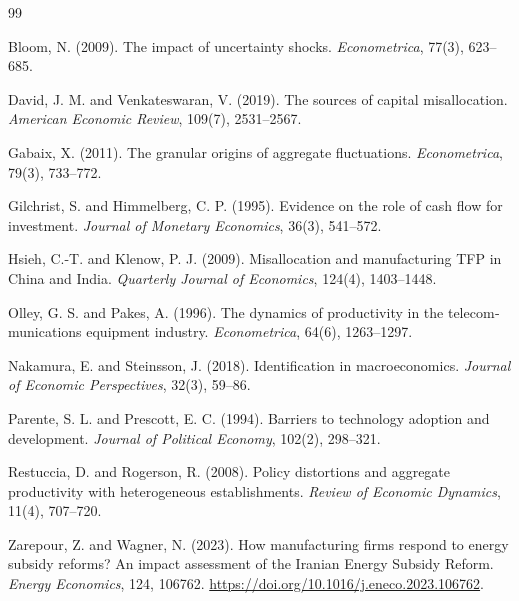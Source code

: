 \documentclass[11pt]{article}
\begin{document}
\begin{latin}
\begin{thebibliography}{99}

Bloom, N. (2009).
The impact of uncertainty shocks.
\textit{Econometrica}, 77(3), 623--685.


David, J. M. and Venkateswaran, V. (2019).
The sources of capital misallocation.
\textit{American Economic Review}, 109(7), 2531--2567.

Gabaix, X. (2011).
The granular origins of aggregate fluctuations.
\textit{Econometrica}, 79(3), 733--772.

Gilchrist, S. and Himmelberg, C. P. (1995).
Evidence on the role of cash flow for investment.
\textit{Journal of Monetary Economics}, 36(3), 541--572.

Hsieh, C.-T. and Klenow, P. J. (2009).
Misallocation and manufacturing TFP in China and India.
\textit{Quarterly Journal of Economics}, 124(4), 1403--1448.

Olley, G. S. and Pakes, A. (1996).
The dynamics of productivity in the telecommunications equipment industry.
\textit{Econometrica}, 64(6), 1263--1297.

Nakamura, E. and Steinsson, J. (2018).
Identification in macroeconomics.
\textit{Journal of Economic Perspectives}, 32(3), 59--86.

Parente, S. L. and Prescott, E. C. (1994).
Barriers to technology adoption and development.
\textit{Journal of Political Economy}, 102(2), 298--321.

Restuccia, D. and Rogerson, R. (2008).
Policy distortions and aggregate productivity with heterogeneous establishments.
\textit{Review of Economic Dynamics}, 11(4), 707--720.

Zarepour, Z. and Wagner, N. (2023).
How manufacturing firms respond to energy subsidy reforms? An impact assessment of the Iranian Energy Subsidy Reform.
\textit{Energy Economics}, 124, 106762.
\url{https://doi.org/10.1016/j.eneco.2023.106762}.

\end{thebibliography}
\end{latin}
\end{document}
